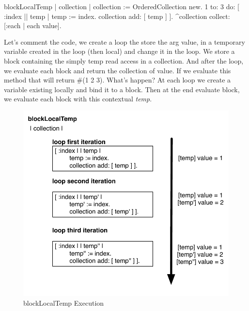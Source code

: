 \documentclass[a4paper,10pt,twoside]{book}
\begin{document}
\begin{code}{}
blockLocalTemp
	| collection |
		collection := OrderedCollection new.
		1 to: 3 do: [ :index || temp |
			temp := index. 
			collection add: [ temp ] ].
		^collection collect: [:each | each value].
\end{code}

Let's comment the code, we create a loop the store the arg value, in a temporary variable created in the loop (then local) and change it in the loop. We store a block containing the simply temp read access in a collection. And after the loop, we evaluate each block and return the collection of value.
If we evaluate this method that will return \#(1 2 3). What's happen? At each loop we create a variable existing locally and bind it to a block. Then at the end evaluate block, we evaluate each block with this contextual \emph{temp}. 

\begin{figure}[htbp]
	\centering
        \includegraphics[width=0.7\linewidth]{blockClosureLocalTemp}
	\caption{blockLocalTemp Execution}
	\label{fig:blockLocalTempExecution}
\end{figure}
\end{document}
